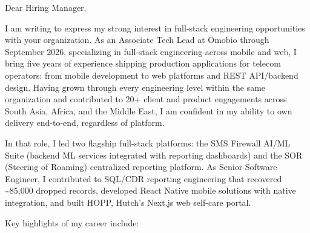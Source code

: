 \documentclass[11pt]{article}
\begin{document}

Dear Hiring Manager,

I am writing to express my strong interest in full-stack engineering opportunities with your organization. As an Associate Tech Lead at Omobio through September 2026, specializing in full-stack engineering across mobile and web, I bring five years of experience shipping production applications for telecom operators: from mobile development to web platforms and REST API/backend design. Having grown through every engineering level within the same organization and contributed to 20+ client and product engagements across South Asia, Africa, and the Middle East, I am confident in my ability to own delivery end-to-end, regardless of platform.

In that role, I led two flagship full-stack platforms: the SMS Firewall AI/ML Suite (backend ML services integrated with reporting dashboards) and the SOR (Steering of Roaming) centralized reporting platform. As Senior Software Engineer, I contributed to SQL/CDR reporting engineering that recovered \textasciitilde85,000 dropped records, developed React Native mobile solutions with native integration, and built HOPP, Hutch's Next.js web self-care portal.

Key highlights of my career include:

\begin{clitems}
  \item {}
  \item {}
  \item {}
  \item {}
\end{clitems}
\end{document}
